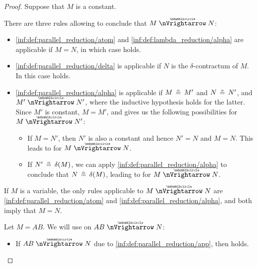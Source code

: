 \begin{proof}
   Suppose that \( M \) is a constant.

  There are three rules allowing to conclude that \( M \ppred N \):
  \begin{itemize}
    \item \ref{inf:def:parallel_reduction/atom} and \ref{inf:def:lambda_reduction/alpha} are applicable if \( M = N \), in which case  holds.

    \item \ref{inf:def:parallel_reduction/delta} is applicable if \( N \) is the \( \delta \)-contractum of \( M \). In this case  holds.

    \item \ref{inf:def:parallel_reduction/alpha} is applicable if \( M \aequiv M' \) and \( N \aequiv N' \), and \( M' \ppred N' \), where the inductive hypothesis holds for the latter. Since \( M' \) is constant, \( M = M' \), and  gives us the following possibilities for \( M \ppred N' \):

    \begin{itemize}
      \item If \( M = N' \), then \( N' \) is also a constant and hence \( N' = N \) and \( M = N \). This leads to  for \( M \ppred N \).

      \item If \( N' \aequiv \op*{\delta}(M) \), we can apply \ref{inf:def:parallel_reduction/alpha} to conclude that \( N \aequiv \op*{\delta}(M) \), leading to  for \( M \ppred N \).
    \end{itemize}
  \end{itemize}

   If \( M \) is a variable, the only rules applicable to \( M \ppred N \) are \ref{inf:def:parallel_reduction/atom} and \ref{inf:def:parallel_reduction/alpha}, and both imply that \( M = N \).

   Let \( M = AB \). We will use  on \( AB \ppred N \):
  \begin{itemize}
    \item If \( AB \ppred N \) due to \ref{inf:def:parallel_reduction/app}, then  holds.


\end{itemize}
\end{proof}
